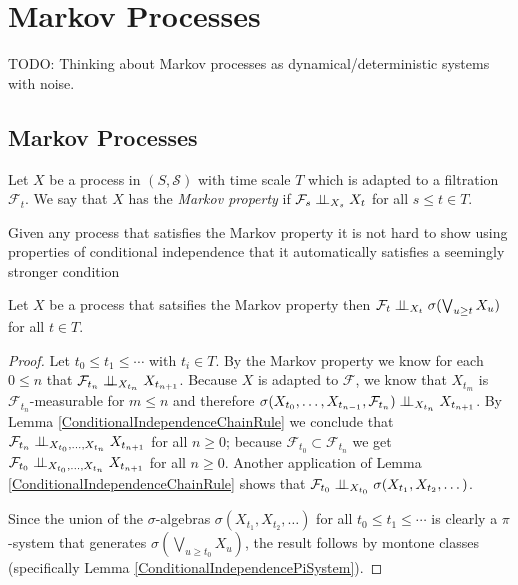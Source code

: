 \section{Markov Processes}

TODO: Thinking about Markov processes as dynamical/deterministic systems with noise.

\subsection{Markov Processes}
\begin{defn}Let $X$ be a process in $(S, \mathcal{S})$ with time scale
  $T$ which is adapted to a filtration $\mathcal{F}_t$.  We say that
  $X$ has the \emph{Markov property} if 
$\cindependent{\mathcal{F}_s}{X_t}{X_s}$ for all $s \leq t \in T$.
\end{defn}
Given any process that satisfies the Markov property it is not hard to
show using properties of conditional independence that it
automatically satisfies a seemingly stronger condition
\begin{lem}\label{ExtendedMarkovProperty}
Let $X$ be a process that satsifies the Markov property
  then $\cindependent{\mathcal{F}_t}{\sigma(\bigvee_{u \geq t}
    X_u)}{X_t}$ for all $t \in T$.
\end{lem}
\begin{proof}
Let $t_0 \leq t_1 \leq \cdots $ with $t_i \in T$.  By the
Markov property we know for each $0 \leq n$ that
$\cindependent{\mathcal{F}_{t_n}}{X_{t_{n+1}}}{X_{t_n}}$.  Because $X$ is
adapted to $\mathcal{F}$, we know that $X_{t_m}$ is
$\mathcal{F}_{t_n}$-measurable for $m \leq n$ and therefore
$\cindependent{\sigma(X_{t_0}, \dots
  ,X_{t_{n-1}},\mathcal{F}_{t_n})}{X_{t_{n+1}}}{X_{t_n}}$.
By Lemma \ref{ConditionalIndependenceChainRule} we conclude that $\cindependent{\mathcal{F}_{t_n}}{X_{t_{n+1}}}{X_{t_0}, \dots
  ,X_{t_n}}$ for all $n \geq 0$; because $\mathcal{F}_{t_0} \subset
\mathcal{F}_{t_n}$ we get $\cindependent{\mathcal{F}_{t_0}}{X_{t_{n+1}}}{X_{t_0}, \dots
  ,X_{t_n}}$ for all $n \geq 0$.  Another application of Lemma
\ref{ConditionalIndependenceChainRule} shows that
$\cindependent{\mathcal{F}_{t_0}}{\sigma(X_{t_1}, X_{t_2},
  \dots)}{X_{t_0}}$.

Since the union of the $\sigma$-algebras $\sigma(X_{t_1}, X_{t_2},
  \dots )$ for all $t_0 \leq t_1 \leq \cdots $ is
  clearly a $\pi$-system that generates $\sigma(\bigvee_{u \geq t_0}X_u)$, the result follows by montone classes (specifically Lemma \ref{ConditionalIndependencePiSystem}).
\end{proof}

